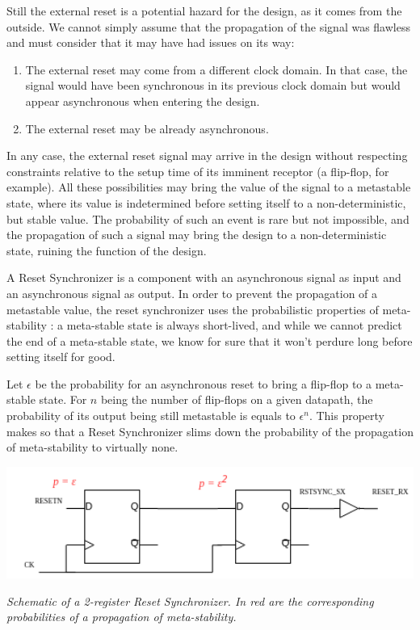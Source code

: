 \documentclass[a4paper]{article}
\begin{document}
Still the external reset is a potential hazard for the design, as it comes from the outside. We cannot
simply assume that the propagation of the signal was flawless and must consider that it may have
had issues on its way:
\begin{enumerate}
  \item The external reset may come from a different clock domain. In that case, the signal would have
  been synchronous in its previous clock domain but would appear asynchronous when entering the design.
  \item The external reset may be already asynchronous.
\end{enumerate}
In any case, the external reset signal may arrive in the design without respecting constraints relative
to the setup time of its imminent receptor (a flip-flop, for example).
All these possibilities may bring the value of the signal to a metastable state, where its value is
indetermined before setting itself to a non-deterministic, but stable value. The probability of such an
event is rare but not impossible, and the propagation of such a signal may bring the design to a
non-deterministic state, ruining the function of the design.

A Reset Synchronizer is a component with an asynchronous signal as input and an asynchronous signal as
output. In order to prevent the propagation of a metastable value, the reset synchronizer uses the
probabilistic properties of meta-stability : a meta-stable state is always short-lived, and while we
cannot predict the end of a meta-stable state, we know for sure that it won't perdure long before
setting itself for good.

Let $\epsilon$ be the probability for an asynchronous reset to bring a flip-flop to a meta-stable state.
For $n$ being the number of flip-flops on a given datapath, the probability of its output being still
metastable is equals to $\epsilon^n$. This property makes so that a Reset Synchronizer slims down the
probability of the propagation of meta-stability to virtually none.

\includegraphics[width=15cm]{./reset_synchronizer.png}
\begin{center}
  {\it Schematic of a 2-register Reset Synchronizer. In red are the corresponding probabilities of a
  propagation of meta-stability.}
\end{center}
\end{document}
